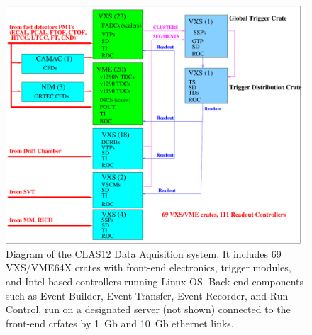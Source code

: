\begin{figure}[hbt]
	\centering
	\includegraphics[width=1.0\columnwidth,keepaspectratio]{img/CLAS12_HARDWARE_2.pdf}
	\caption{Diagram of the CLAS12 Data Aquisition system. It includes 69 VXS/VME64X crates with front-end electronics, trigger modules, and Intel-based controllers running Linux OS. Back-end components such as Event Builder, Event Transfer, Event Recorder, and Run Control, run on a designated server (not shown) connected to the front-end crfates by 1~Gb and 10~Gb ethernet links.}
	\label{fig:DAQdiagram}
\end{figure}

